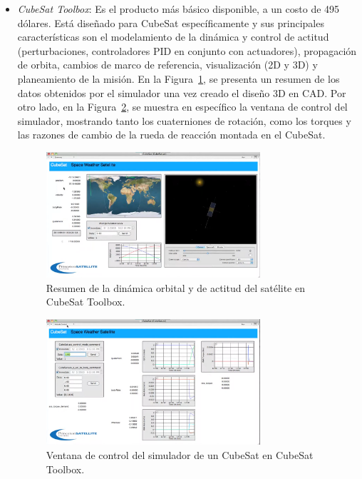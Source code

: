 \begin{itemize}
	\item \textit{CubeSat Toolbox}: Es el producto más básico disponible, a un costo de 495 dólares. Está diseñado para CubeSat específicamente y sus principales características son el modelamiento de la dinámica y control de actitud (perturbaciones, controladores PID en conjunto con actuadores), propagación de orbita, cambios de marco de referencia, visualización (2D y 3D) y planeamiento de la misión. En la Figura~\ref{fig:cube_Tool}, se presenta un resumen de los datos obtenidos por el simulador una vez creado el diseño 3D en CAD. Por otro lado, en la Figura~\ref{fig:cube_ctrl}, se muestra en específico la ventana de control del simulador, mostrando tanto los cuaterniones de rotación, como los torques y las razones de cambio de la rueda de reacción montada en el CubeSat.
	
	\begin{figure}[H]
		\centering    
		\includegraphics[width=0.75\textwidth]{Cubesat_Toolbox.png}
		\caption{Resumen de la dinámica orbital y de actitud del satélite en CubeSat Toolbox.}
		\label{fig:cube_Tool}
	\end{figure}
	
	\begin{figure}[H]
		\centering    
		\includegraphics[width=0.75\textwidth]{Cubesat_Toolbox_2.png}
		\caption{Ventana de control del simulador de un CubeSat en CubeSat Toolbox.}
		\label{fig:cube_ctrl}
	\end{figure}
	

\end{itemize}
